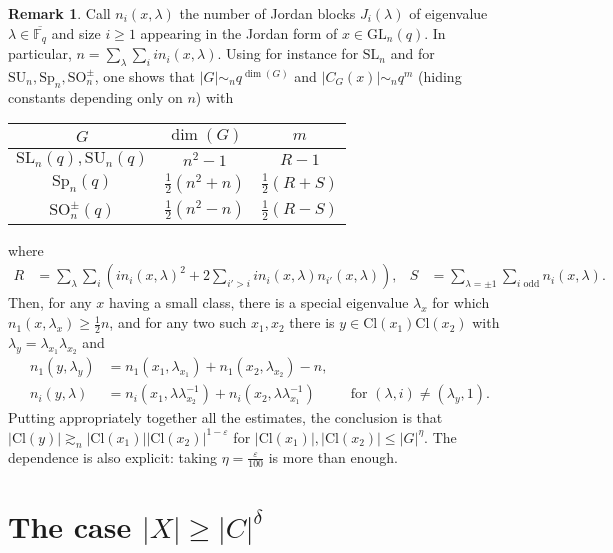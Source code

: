 \documentclass[a4paper]{article}
\theoremstyle{definition}
\newtheorem{remark}[proposition]{Remark}
\numberwithin{equation}{section}
\begin{document}
\begin{remark}
Call $n_{i}(x,\lambda)$ the number of Jordan blocks $J_{i}(\lambda)$ of eigenvalue $\lambda\in\overline{\mathbb{F}_{q}}$ and size $i\geq 1$ appearing in the Jordan form of $x\in\mathrm{GL}_{n}(q)$. In particular, $n=\sum_{\lambda}\sum_{i}in_{i}(x,\lambda)$. Using for instance \cite[p.~3054]{FG12} for $\mathrm{SL}_{n}$ and \cite[pp.~34-36-39]{Wal63} for $\mathrm{SU}_{n},\mathrm{Sp}_{n},\mathrm{SO}_{n}^{\pm}$, one shows that $|G|\sim_{n}q^{\dim(G)}$ and $|C_{G}(x)|\sim_{n} q^{m}$ (hiding constants depending only on $n$) with
\begin{center}
\def\arraystretch{1.3}
\begin{tabular}{|c||c|c|}\hline
$G$ & $\dim(G)$ & $m$ \\ \hline\hline
$\mathrm{SL}_{n}(q),\mathrm{SU}_{n}(q)$ & $n^{2}-1$ & $R-1$ \\ \hline
$\mathrm{Sp}_{n}(q)$ & $\frac{1}{2}(n^{2}+n)$ & $\frac{1}{2}(R+S)$ \\ \hline
$\mathrm{SO}_{n}^{\pm}(q)$ & $\frac{1}{2}(n^{2}-n)$ & $\frac{1}{2}(R-S)$ \\ \hline
\end{tabular}
\end{center}
where
\begin{align*}
R & =\sum_{\lambda}\sum_{i}\left(in_{i}(x,\lambda)^{2}+2\sum_{i'>i}in_{i}(x,\lambda)n_{i'}(x,\lambda)\right), & S & =\sum_{\lambda=\pm 1}\sum_{\text{$i$ odd}}n_{i}(x,\lambda).
\end{align*}
Then, for any $x$ having a small class, there is a special eigenvalue $\lambda_{x}$ for which $n_{1}(x,\lambda_{x})\geq\frac{1}{2}n$, and for any two such $x_{1},x_{2}$ there is $y\in\mathrm{Cl}(x_{1})\mathrm{Cl}(x_{2})$ with $\lambda_{y}=\lambda_{x_{1}}\lambda_{x_{2}}$ and
\begin{align*}
n_{1}(y,\lambda_{y}) & =n_{1}(x_{1},\lambda_{x_{1}})+n_{1}(x_{2},\lambda_{x_{2}})-n, & & \\
n_{i}(y,\lambda) & =n_{i}(x_{1},\lambda\lambda_{x_{2}}^{-1})+n_{i}(x_{2},\lambda\lambda_{x_{1}}^{-1}) & & \text{for $(\lambda,i)\neq(\lambda_{y},1)$.}
\end{align*}
Putting appropriately together all the estimates, the conclusion is that $|\mathrm{Cl}(y)|\gtrsim_{n}|\mathrm{Cl}(x_{1})||\mathrm{Cl}(x_{2})|^{1-\varepsilon}$ for $|\mathrm{Cl}(x_{1})|,|\mathrm{Cl}(x_{2})|\leq|G|^{\eta}$. The dependence is also explicit: taking $\eta=\frac{\varepsilon}{100}$ is more than enough.
\end{remark}

\section{The case $|X|\geq|C|^{\delta}$}\label{se:xcldelta}
\end{document}

